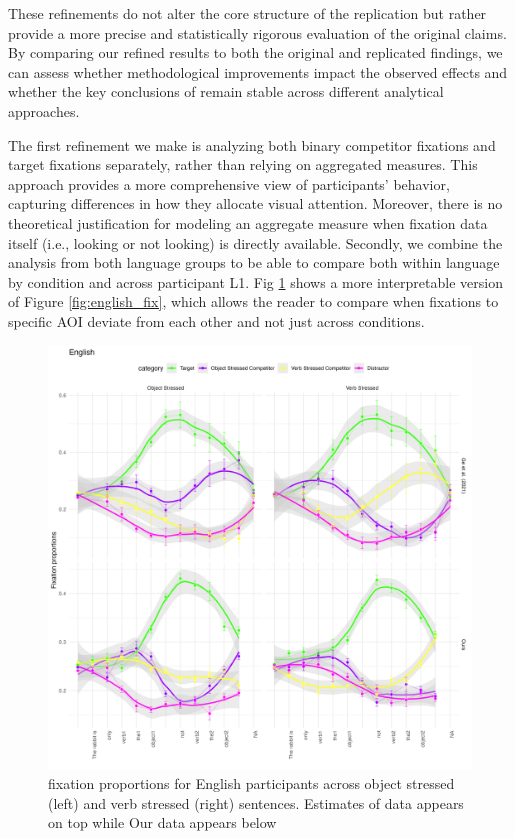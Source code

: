 These refinements do not alter the core structure of the replication but rather provide a more precise and statistically rigorous evaluation of the original claims. By comparing our refined results to both the original and replicated findings, we can assess whether methodological improvements impact the observed effects and whether the key conclusions of \cite{Ge2021} remain stable across different analytical approaches.

The first refinement we make is analyzing both binary competitor fixations and target fixations separately, rather than relying on aggregated measures. This approach provides a more comprehensive view of participants’ behavior, capturing differences in how they allocate visual attention. Moreover, there is no theoretical justification for modeling an aggregate measure when fixation data itself (i.e., looking or not looking) is directly available. Secondly, we combine the analysis from both language groups to be able to compare both within language by condition and across participant L1. Fig \ref{fig:english_fix2} shows a more interpretable version of Figure \ref{fig:english_fix}, which allows the reader to compare when fixations to specific AOI deviate from each other and not just across conditions.

\begin{figure}[H]  %
    \centering
    \includegraphics[width=\textwidth,height=\textheight,keepaspectratio]{viz/english_fix2.png}
    \caption{fixation proportions for English participants across object stressed (left) and verb stressed (right) sentences. Estimates of \citep{Ge2021} data appears on top while Our data appears below}
    \label{fig:english_fix2}
\end{figure}

